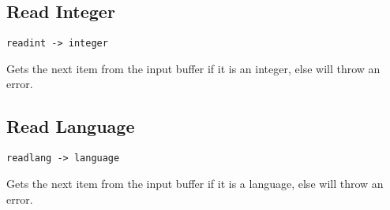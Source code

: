 
\subsection{Read Integer}
\begin{center}
\begin{minipage}{5cm}
\begin{verbatim}
readint -> integer
\end{verbatim}
\end{minipage}
\end{center}
\begin{normalsize}
Gets the next item from the input buffer if it is an integer, else will throw an error.
\end{normalsize}

\subsection{Read Language}
\begin{center}
\begin{minipage}{5cm}
\begin{verbatim}
readlang -> language
\end{verbatim}
\end{minipage}
\end{center}
\begin{normalsize}
Gets the next item from the input buffer if it is a language, else will throw an error.
\end{normalsize}




\iffalse
\subsection{Addition}
\begin{center}
\begin{minipage}{5cm}
\begin{verbatim}
LANG I LANG -> 
\end{verbatim}
\end{minipage}
\end{center}
\begin{normalsize}

\end{normalsize}
\fi
